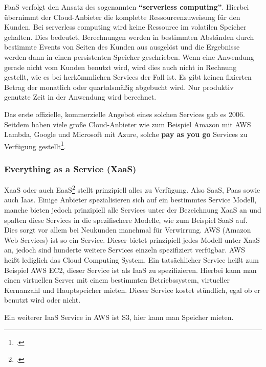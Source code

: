 FaaS verfolgt den Ansatz des sogenannten \textbf{"`serverless computing"'}. Hierbei übernimmt der Cloud-Anbieter die komplette Ressourcenzuweisung für den Kunden.
Bei serverless computing wird keine Ressource im volatilen Speicher gehalten.
Dies bedeutet, Berechnungen werden in bestimmten Abständen durch bestimmte Events von Seiten des Kunden aus ausgelöst und die Ergebnisse werden dann in einen persistenten Speicher geschrieben.
Wenn eine Anwendung gerade nicht vom Kunden benutzt wird, wird dies auch nicht in Rechnung gestellt, wie es bei herkömmlichen Services der Fall ist.
Es gibt keinen fixierten Betrag der monatlich oder quartalsmäßig abgebucht wird.
Nur produktiv genutzte Zeit in der Anwendung wird berechnet.

Das erste offizielle, kommerzielle Angebot eines solchen Services gab es 2006. Seitdem haben viele große Cloud-Anbieter wie zum Beispiel Amazon mit AWS Lambda, Google und Microsoft mit Azure, solche \textbf{pay as you go} Services zu Verfügung gestellt\footcite{cloud-computing}.

\subsubsection{Everything as a Service (XaaS)}
XaaS oder auch EaaS\footcite{cloud-eaas} stellt prinzipiell alles zu Verfügung. Also SaaS, Paas sowie auch Iaas.
Einige Anbieter spezialisieren sich auf ein bestimmtes Service Modell, manche bieten jedoch prinzipiell alle Services unter der Bezeichnung XaaS an und spalten diese Services in die spezifischere Modelle, wie zum Beispiel SaaS auf.
Dies sorgt vor allem bei Neukunden manchmal für Verwirrung. AWS (Amazon Web Services) ist so ein Service.
Dieser bietet prinzipiell jedes Modell unter XaaS an, jedoch sind hunderte weitere Services einzeln spezifiziert verfügbar. AWS heißt lediglich das Cloud Computing System.
Ein tatsächlicher Service heißt zum Beispiel AWS EC2, dieser Service ist als IaaS zu spezifizieren.
Hierbei kann man einen virtuellen Server mit einem bestimmten Betriebssystem, virtueller Kernanzahl und Hauptspeicher mieten. Dieser Service kostet stündlich, egal ob er benutzt wird oder nicht.

Ein weiterer IaaS Service in AWS ist S3, hier kann man Speicher mieten.

